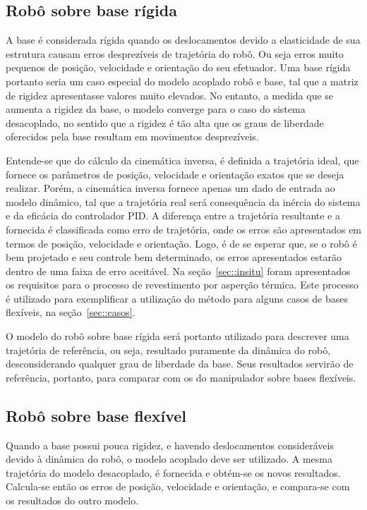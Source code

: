 \subsection{Robô sobre base rígida}

A base é considerada rígida quando os deslocamentos devido a elasticidade de
sua estrutura causam erros desprezíveis de trajetória do robô. Ou seja erros
muito pequenos de posição, velocidade e orientação do seu efetuador. Uma base
rígida portanto seria um caso especial do modelo acoplado robô e base, tal que a
matriz de rigidez apresentasse valores muito elevados. No entanto, a medida que
se aumenta a rigidez da base, o modelo converge para o caso do sistema
desacoplado, no sentido que a rigidez é tão alta que os graus de liberdade
oferecidos pela base resultam em movimentos desprezíveis.

Entende-se que do cálculo da cinemática inversa, é definida a trajetória ideal,
que fornece os parâmetros de posição, velocidade e orientação exatos que se
deseja realizar.
Porém, a cinemática inversa fornece apenas um dado de entrada ao modelo
dinâmico, tal que a trajetória real será consequência da inércia do sistema e da
eficácia do controlador PID. A diferença entre a trajetória resultante e a
fornecida é classificada como erro de trajetória, onde os erros são apresentados
em termos de posição, velocidade e orientação. Logo, é de se esperar que, se o robô
é bem projetado e seu controle bem determinado, os erros apresentados estarão
dentro de uma faixa de erro aceitável. Na seção~\ref{sec::insitu} foram
apresentados os requisitos para o processo de revestimento por asperção
térmica. Este processo é utilizado para exemplificar a utilização do método
para alguns casos de bases flexíveis, na seção~\ref{sec::casos}.

O modelo do robô sobre base rígida será portanto utilizado para descrever uma
trajetória de referência, ou seja, resultado puramente da dinâmica do robô,
desconsiderando qualquer grau de liberdade da base. Seus resultados servirão de
referência, portanto, para comparar com os do manipulador sobre bases flexíveis.

\subsection{Robô sobre base flexível}

Quando a base possui pouca rigidez, e havendo deslocamentos consideráveis devido
à dinâmica do robô, o modelo acoplado deve ser utilizado. A mesma trajetória do
modelo desacoplado, é fornecida e obtém-se os novos resultados. Calcula-se então
os erros de posição, velocidade e orientação, e compara-se com os resultados do
outro modelo.




